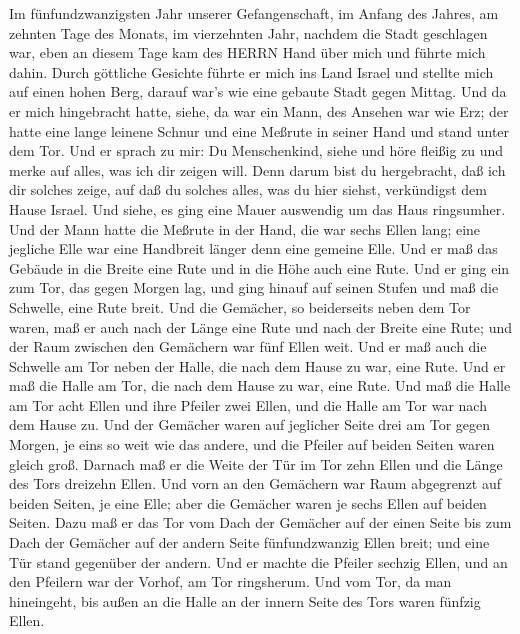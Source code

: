  Im fünfundzwanzigsten Jahr unserer Gefangenschaft, im
Anfang des Jahres, am zehnten Tage des Monats, im vierzehnten Jahr,
nachdem die Stadt geschlagen war, eben an diesem Tage kam des HERRN Hand
über mich und führte mich dahin.  Durch göttliche Gesichte
führte er mich ins Land Israel und stellte mich auf einen hohen Berg,
darauf war's wie eine gebaute Stadt gegen Mittag.  Und da er
mich hingebracht hatte, siehe, da war ein Mann, des Ansehen war wie Erz;
der hatte eine lange leinene Schnur und eine Meßrute in seiner Hand und
stand unter dem Tor.  Und er sprach zu mir: Du Menschenkind,
siehe und höre fleißig zu und merke auf alles, was ich dir zeigen will.
Denn darum bist du hergebracht, daß ich dir solches zeige, auf daß du
solches alles, was du hier siehst, verkündigst dem Hause Israel.
 Und siehe, es ging eine Mauer auswendig um das Haus
ringsumher. Und der Mann hatte die Meßrute in der Hand, die war sechs
Ellen lang; eine jegliche Elle war eine Handbreit länger denn eine
gemeine Elle. Und er maß das Gebäude in die Breite eine Rute und in die
Höhe auch eine Rute.  Und er ging ein zum Tor, das gegen
Morgen lag, und ging hinauf auf seinen Stufen und maß die Schwelle, eine
Rute breit.  Und die Gemächer, so beiderseits neben dem Tor
waren, maß er auch nach der Länge eine Rute und nach der Breite eine
Rute; und der Raum zwischen den Gemächern war fünf Ellen weit. Und er
maß auch die Schwelle am Tor neben der Halle, die nach dem Hause zu war,
eine Rute.  Und er maß die Halle am Tor, die nach dem Hause
zu war, eine Rute.  Und maß die Halle am Tor acht Ellen und
ihre Pfeiler zwei Ellen, und die Halle am Tor war nach dem Hause zu.
 Und der Gemächer waren auf jeglicher Seite drei am Tor
gegen Morgen, je eins so weit wie das andere, und die Pfeiler auf beiden
Seiten waren gleich groß.  Darnach maß er die Weite der Tür
im Tor zehn Ellen und die Länge des Tors dreizehn Ellen. 
Und vorn an den Gemächern war Raum abgegrenzt auf beiden Seiten, je eine
Elle; aber die Gemächer waren je sechs Ellen auf beiden Seiten.
 Dazu maß er das Tor vom Dach der Gemächer auf der einen
Seite bis zum Dach der Gemächer auf der andern Seite fünfundzwanzig
Ellen breit; und eine Tür stand gegenüber der andern.  Und
er machte die Pfeiler sechzig Ellen, und an den Pfeilern war der Vorhof,
am Tor ringsherum.  Und vom Tor, da man hineingeht, bis
außen an die Halle an der innern Seite des Tors waren fünfzig Ellen.
